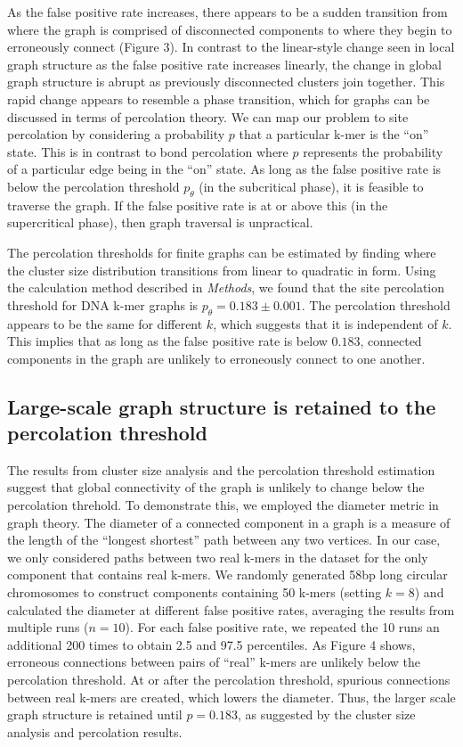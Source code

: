 \documentclass[12pt]{article} \usepackage{simplemargins}
\begin{document}
As the false positive rate increases, there appears to be a sudden
transition from where the graph is comprised of disconnected 
components to where they begin to erroneously connect (Figure 3). 
In contrast to the linear-style change seen 
in local graph structure as the false positive rate increases linearly, 
the change in global graph structure is abrupt as previously disconnected 
clusters join together.  
This rapid change appears to resemble a phase transition, which for graphs
can be 
discussed in terms of percolation theory. We can map 
our problem to site percolation by considering a probability $p$ that a 
particular k-mer is the ``on'' state. This is in contrast to bond percolation where 
$p$ represents the probability of a particular edge being in the ``on'' state. As
long as the false positive rate is below the percolation threshold $p_\theta$ (in
the subcritical phase), it is feasible to traverse the graph. If the
false positive rate is at or above this (in the supercritical phase), then graph
traversal is unpractical.


The percolation thresholds for finite graphs can be estimated by
finding where the cluster size distribution transitions from linear to
quadratic in form.  Using the calculation method described
in \emph{Methods}, we found that the site percolation threshold for
DNA k-mer graphs is $p_\theta = 0.183 \pm 0.001$.  The percolation
threshold appears to be the same for different $k$, which suggests
that it is independent of $k$. This implies that as long as
the false positive rate is below $0.183$, connected components in the
graph are unlikely to erroneously connect to one another.

\subsection{Large-scale graph structure is retained to the percolation threshold}
The results from cluster size analysis and the percolation threshold 
estimation suggest that 
global connectivity of the graph is unlikely 
to change below the percolation threhold. To demonstrate this, we employed 
the diameter metric in graph theory.  
The diameter of a connected component in a graph is a measure of 
the length of the ``longest shortest'' 
path between any two vertices\cite{bondy2008graph}.
In our case, we only considered paths between two real k-mers
in the dataset for the only component that contains real k-mers. 
We randomly generated 58bp long circular
chromosomes to construct components containing 50 k-mers (setting $k=8$) and 
calculated the diameter at different false positive rates, averaging
the results from multiple runs ($n=10$). For each false positive rate, we 
repeated the 10 runs an additional 200 times to obtain 2.5 and 97.5 
percentiles. 
As Figure 4 shows, 
erroneous connections between pairs of ``real'' k-mers are unlikely
below the 
percolation threshold. At or after the percolation threshold, spurious connections 
between real k-mers are created, which lowers the diameter. 
Thus, the larger scale graph structure is retained until $p=0.183$, as suggested by the cluster size analysis and percolation results.
\end{document}
